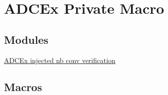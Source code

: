 \hypertarget{group___a_d_c_ex___private___macro}{}\section{A\+D\+C\+Ex Private Macro}
\label{group___a_d_c_ex___private___macro}
\subsection*{Modules}
\begin{DoxyCompactItemize}
\item 
\hyperlink{group___a_d_c_ex__injected__nb__conv__verification}{A\+D\+C\+Ex injected nb conv verification}
\end{DoxyCompactItemize}
\subsection*{Macros}
